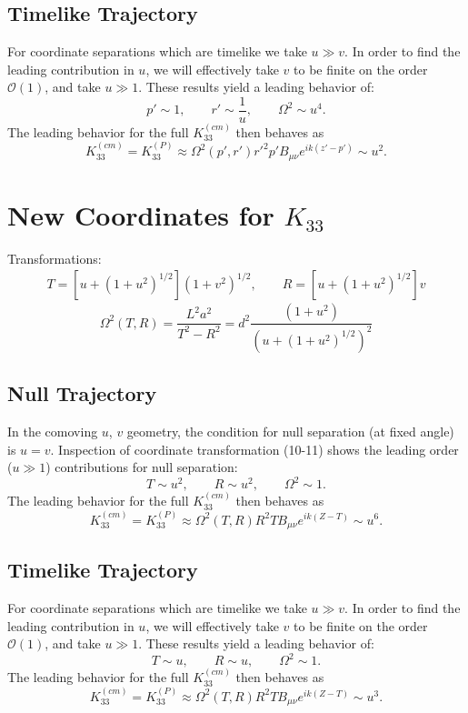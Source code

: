 \documentclass[10pt,letterpaper]{article}
\begin{document}
\subsection*{Timelike Trajectory}
For coordinate separations which are timelike we take $u\gg v$. In order to find the leading contribution in $u$, we will effectively take $v$ to be finite on the order $\mathcal O(1)$,  and take $u\gg1$. These results yield a leading behavior of:
\begin{equation}
p'\sim 1,\qquad r'\sim \frac{1}{u},\qquad \Omega^2\sim u^4. 
\end{equation}
The leading behavior for the full $K_{33}^{(cm)}$ then behaves as
\begin{equation}
\boxed{
K^{(cm)}_{33}=K^{(P)}_{33} \approx \Omega^2(p',r') r'^2 p' B_{\mu\nu} e^{ik(z'-p')} \sim u^2.
}
\end{equation}
\section*{New Coordinates for $K_{33}$}
Transformations:
\begin{align}
T = \left[u+(1+u^2)^{1/2}\right]( 1+v^2)^{1/2},\qquad R = \left[u+(1+u^2)^{1/2}\right]v
\end{align}
\begin{equation}
\Omega^2(T,R) = \frac{L^2 a^2}{T^2-R^2} = d^2\frac{(1+u^2)}{(u+(1+u^2)^{1/2})^2}
\end{equation}
\subsection*{Null Trajectory}
In the comoving $u$, $v$ geometry, the condition for null separation (at fixed angle) is $u=v$. Inspection of coordinate transformation (10-11) shows the leading order ($u\gg 1$) contributions for null separation:
\begin{equation}
T \sim u^2,\qquad R \sim u^2,\qquad \Omega^2 \sim 1. 
\end{equation}
The leading behavior for the full $K_{33}^{(cm)}$ then behaves as
\begin{equation}
\boxed{
K^{(cm)}_{33}=K^{(P)}_{33} \approx \Omega^2(T,R) R^2 T B_{\mu\nu} e^{ik(Z-T)} \sim u^6.
}
\end{equation}
\subsection*{Timelike Trajectory}
For coordinate separations which are timelike we take $u\gg v$. In order to find the leading contribution in $u$, we will effectively take $v$ to be finite on the order $\mathcal O(1)$,  and take $u\gg1$. These results yield a leading behavior of:
\begin{equation}
T\sim u,\qquad R\sim u,\qquad \Omega^2\sim 1. 
\end{equation}
The leading behavior for the full $K_{33}^{(cm)}$ then behaves as
\begin{equation}
\boxed{
K^{(cm)}_{33}=K^{(P)}_{33} \approx \Omega^2(T,R) R^2 T B_{\mu\nu} e^{ik(Z-T)} \sim u^3.
}
\end{equation}
\end{document}
